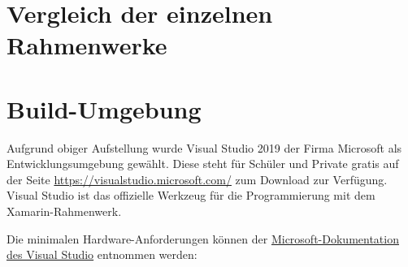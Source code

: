 \section{Vergleich der einzelnen Rahmenwerke}
%
\section{Build-Umgebung}
Aufgrund obiger Aufstellung wurde Visual Studio 2019 der Firma Microsoft als Entwicklungsumgebung gewählt.
Diese steht für Schüler und Private gratis auf der Seite {\href{https://visualstudio.microsoft.com/}{https://visualstudio.microsoft.com/}} zum Download zur Verfügung.
Visual Studio ist das offizielle Werkzeug für die Programmierung mit dem Xamarin-Rahmenwerk.

%
Die minimalen Hardware-Anforderungen können der \href{https://docs.microsoft.com/en-us/visualstudio/releases/2019/system-requirements}{Microsoft-Dokumentation des Visual Studio} entnommen werden:

